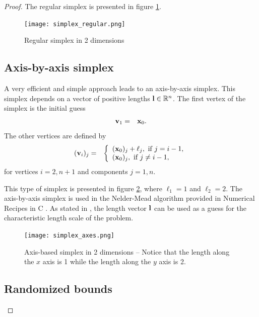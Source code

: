 \begin{proof}
The regular simplex is presented in figure \ref{fig-nm-simplex-regular}.

\begin{figure}
\begin{center}
\texttt{[image: simplex\_regular.png]}
\end{center}
\caption{Regular simplex in 2 dimensions}
\label{fig-nm-simplex-regular}
\end{figure}

\subsection{Axis-by-axis simplex}

A very efficient and simple approach leads to an axis-by-axis simplex.
This simplex depends on a vector of positive lengths $\mathbf{l}\in\mathbb{R}^n$.
The first vertex of the simplex is the initial guess 
\begin{eqnarray}
\mathbf{v}_1 &=& \mathbf{x}_0.
\end{eqnarray}
The other vertices are defined by 
\begin{eqnarray}
(\mathbf{v}_i)_j &=& 
\left\{
\begin{array}{l}
(\mathbf{x}_0)_j + \ell_j, \textrm{ if } j=i-1,\\
(\mathbf{x}_0)_j, \textrm{ if } j\neq i-1,\\
\end{array}
\right.
\end{eqnarray}
for vertices $i=2,n+1$ and components $j=1,n$.

This type of simplex is presented in figure \ref{fig-nm-simplex-axes},
where $\ell_1=1$ and $\ell_2=2$.
The axis-by-axis simplex is used in the Nelder-Mead 
algorithm provided in Numerical Recipes in C \cite{NumericalRecipes}.
As stated in \cite{NumericalRecipes}, the length vector $\mathbf{l}$ can 
be used as a guess for the characteristic length scale of the problem.

\begin{figure}
\begin{center}
\texttt{[image: simplex\_axes.png]}
\end{center}
\caption{Axis-based simplex in 2 dimensions -- Notice that the length along the $x$ axis is 1 while the length
along the $y$ axis is 2. }
\label{fig-nm-simplex-axes}
\end{figure}

\subsection{Randomized bounds}


\end{proof}
